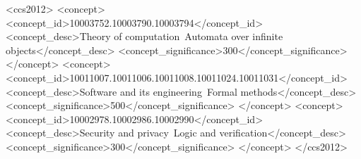 \begin{CCSXML}
<ccs2012>
 <concept>
  <concept_id>10003752.10003790.10003794</concept_id>
  <concept_desc>Theory of computation~Automata over infinite objects</concept_desc>
  <concept_significance>300</concept_significance>
 </concept>
 <concept>
  <concept_id>10011007.10011006.10011008.10011024.10011031</concept_id>
  <concept_desc>Software and its engineering~Formal methods</concept_desc>
  <concept_significance>500</concept_significance>
 </concept>
 <concept>
  <concept_id>10002978.10002986.10002990</concept_id>
  <concept_desc>Security and privacy~Logic and verification</concept_desc>
  <concept_significance>300</concept_significance>
 </concept>
</ccs2012>
\end{CCSXML}


